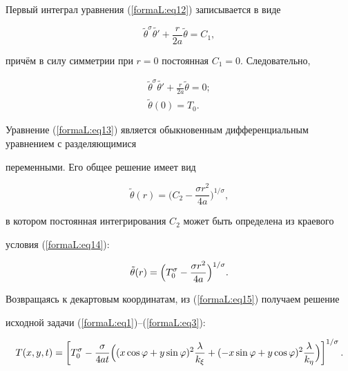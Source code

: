 Первый интеграл уравнения (\ref{formaL:eq12}) записывается в виде

\[

\tilde {\theta }^\sigma \tilde {{\theta }'}+\frac{r}{2a}\tilde {\theta }=

C_1 ,

\]

причём в силу симметрии при $r=0$ постоянная $C_1  = 0$. Следовательно,

\begin{gather}

\label{formaL:eq13}

\tilde {\theta }^\sigma \tilde {{\theta }'}+\frac{r}{2a}\tilde {\theta}=0;

\\

\label{formaL:eq14}

\tilde {\theta }(0)=T_0 .

\end{gather}

Уравнение (\ref{formaL:eq13}) является обыкновенным дифференциальным уравнением с разделяющимися 

переменными. Его общее решение имеет вид

\[

\tilde {\theta }(r)=

\Big(C_2 -\frac{\sigma r^2}{4a}\Bigr)^{1/\sigma },

\]

в котором постоянная интегрирования $C_2 $ может быть определена из краевого 

условия (\ref{formaL:eq14}):

\begin{equation}

\label{formaL:eq15}

\tilde {\theta }(r)=

\Bigl(T_0^\sigma -\frac{\sigma r^2}{4a}\Bigr)^{1/\sigma }.

\end{equation}



Возвращаясь к декартовым координатам, из (\ref{formaL:eq15}) получаем решение 

исходной задачи (\ref{formaL:eq1})--(\ref{formaL:eq3}):

\begin{equation}

\label{formaL:eq16}

T(x,y,t)=\left[ {T_0^\sigma -\frac{\sigma }{4at}\Bigl((x\cos 

\varphi +y\sin \varphi )^2\frac{\lambda }{k_\xi }+(-x\sin 

\varphi +y\cos \varphi )^2\frac{\lambda }{k_\eta }\Bigr)} 

\right]^{1/\sigma }.

\end{equation}



